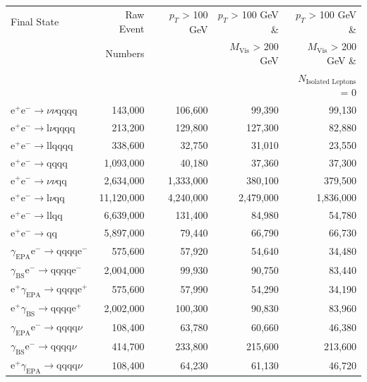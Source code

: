 \begin{table}[h!]
\centering
\begin{tabular}{ l r r r r }
\hline
Final State & Raw Event  & $p_{T}$ > 100 GeV & $p_{T}$ > 100 GeV \& & $p_{T}$ > 100 GeV \& \\ 
& Numbers & & $M_{\text{Vis}}$ > 200 GeV & $M_{\text{Vis}}$ > 200 GeV \&\\ 
& & & & $N_{\text{Isolated Leptons}}$ = 0\\ 
\hline
$\text{e}^{+}\text{e}^{-} \rightarrow \nu{\nu}\text{qqqq}$ & 143,000 & 106,600 & 99,390 & 99,130 \\ 
$\text{e}^{+}\text{e}^{-} \rightarrow \text{l}\nu\text{qqqq}$ & 213,200 & 129,800 & 127,300 & 82,880 \\
$\text{e}^{+}\text{e}^{-} \rightarrow \text{llqqqq}$ &338,600 & 32,750 & 31,010 & 23,550 \\
$\text{e}^{+}\text{e}^{-} \rightarrow \text{qqqq}$ & 1,093,000 & 40,180 & 37,360 & 37,300 \\ 
$\text{e}^{+}\text{e}^{-} \rightarrow \nu{\nu}\text{qq}$ & 2,634,000 & 1,333,000 & 380,100 & 379,500 \\
$\text{e}^{+}\text{e}^{-} \rightarrow \text{l}\nu\text{qq}$ & 11,120,000 & 4,240,000 & 2,479,000 & 1,836,000 \\
$\text{e}^{+}\text{e}^{-} \rightarrow \text{llqq}$ & 6,639,000 & 131,400 & 84,980 & 54,780 \\ 
$\text{e}^{+}\text{e}^{-} \rightarrow \text{qq}$ &5,897,000 & 79,440 & 66,790 & 66,730 \\
$\gamma_{\text{EPA}}\text{e}^{-} \rightarrow \text{qqqq}\text{e}^{-}$ & 575,600 & 57,920 & 54,640 & 34,480 \\ 
$\gamma_{\text{BS}}\text{e}^{-} \rightarrow \text{qqqq}\text{e}^{-}$ & 2,004,000 & 99,930 & 90,750 & 83,440 \\
$\text{e}^{+}\gamma_{\text{EPA}} \rightarrow \text{qqqq}\text{e}^{+}$ & 575,600 & 57,990 & 54,290 & 34,190 \\
$\text{e}^{+}\gamma_{\text{BS}} \rightarrow \text{qqqq}\text{e}^{+}$ & 2,002,000 & 100,300 & 90,830 & 83,960 \\   
$\gamma_{\text{EPA}}\text{e}^{-} \rightarrow \text{qqqq}\nu$ & 108,400 & 63,780 & 60,660 & 46,380 \\
$\gamma_{\text{BS}}\text{e}^{-} \rightarrow \text{qqqq}\nu$ & 414,700 & 233,800 & 215,600 & 213,600 \\
$\text{e}^{+}\gamma_{\text{EPA}} \rightarrow \text{qqqq}\nu$ & 108,400 & 64,230 & 61,130 & 46,720 \\ 

\end{tabular}
\end{table}
